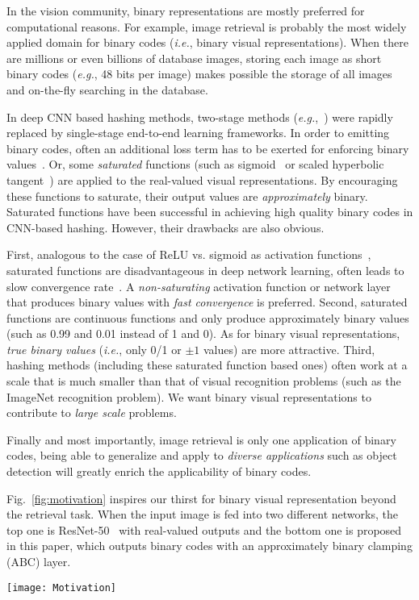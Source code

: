 \documentclass[runningheads]{llncs}
\begin{document}
In the vision community, binary representations are mostly preferred for computational reasons. For example, image retrieval is probably the most widely applied domain for binary codes (\emph{i.e.}, binary visual representations). When there are millions or even billions of database images, storing each image as short binary codes (\emph{e.g.}, 48 bits per image) makes possible the storage of all images and on-the-fly searching in the database.

In deep CNN based hashing methods, two-stage methods (\emph{e.g.},~\cite{Xia14AAAI_r11}) were rapidly replaced by single-stage end-to-end learning frameworks. In order to emitting binary codes, often an additional loss term has to be exerted for enforcing binary values~\cite{Liu16CVPR_r12}. Or, some \emph{saturated} functions (such as sigmoid~\cite{Lin15CVPRW_r13} or scaled hyperbolic tangent~\cite{Li17ACMMM_r14,Cao17ICCV_r15}) are applied to the real-valued visual representations. By encouraging these functions to saturate, their output values are \emph{approximately} binary. Saturated functions have been successful in achieving high quality binary codes in CNN-based hashing. However, their drawbacks are also obvious.

First, analogous to the case of ReLU vs. sigmoid as activation functions~\cite{ReLU}, saturated functions are disadvantageous in deep network learning, often leads to slow convergence rate~\cite{Liu16CVPR_r12}. A \emph{non-saturating} activation function or network layer that produces binary values with \emph{fast convergence} is preferred. Second, saturated functions are continuous functions and only produce approximately binary values (such as 0.99 and 0.01 instead of 1 and 0). As for binary visual representations, \emph{true binary values} (\emph{i.e.}, only 0/1 or $\pm 1$ values) are more attractive. Third, hashing methods (including these saturated function based ones) often work at a scale that is much smaller than that of visual recognition problems (such as the ImageNet recognition problem). We want binary visual representations to contribute to \emph{large scale} problems.

Finally and most importantly, image retrieval is only one application of binary codes, being able to generalize and apply to \emph{diverse applications} such as object detection will greatly enrich the applicability of binary codes.

Fig.~\ref{fig:motivation} inspires our thirst for binary visual representation beyond the retrieval task. When the input image is fed into two different networks, the top one is ResNet-50~\cite{ResNet} with real-valued outputs and the bottom one is proposed in this paper, which outputs binary codes with an approximately binary clamping (ABC) layer.
\begin{figure*}[t]
	\centering
	\texttt{[image: Motivation]}
	\caption{Binary codes (bottom half, produced by the proposed method) \emph{may} achieve better generalization ability than real-valued activation values (top half, produced by ResNet-50), whose magnitudes may be misleading.} \label{fig:motivation}
\end{figure*}
\end{document}
